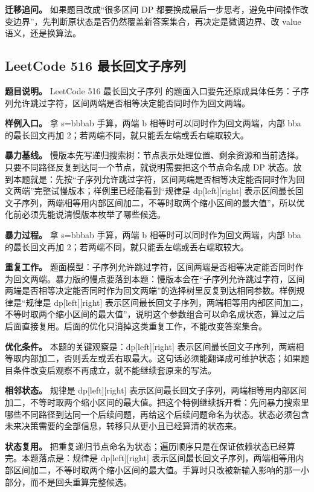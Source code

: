 \textbf{迁移追问。} 如果题目改成“很多区间 DP 都要换成最后一步思考，避免中间操作改变边界”，先判断原状态是否仍然覆盖新答案集合，再决定是微调边界、改 value 语义，还是换算法。

\subsection{LeetCode 516 最长回文子序列}

\textbf{题目说明。} LeetCode 516 最长回文子序列 的题面入口要先还原成具体任务：子序列允许跳过字符，区间两端是否相等决定能否同时作为回文两端。

\textbf{样例入口。} 拿 s=bbbab 手算，两端 b 相等时可以同时作为回文两端，内部 bba 的最长回文再加 2；若两端不同，就只能丢左端或丢右端取较大。

\textbf{暴力基线。} 慢版本先写递归搜索树：节点表示处理位置、剩余资源和当前选择。只要不同路径反复到达同一个节点，就说明需要把这个节点命名成 DP 状态。放到本题就是：先按“子序列允许跳过字符，区间两端是否相等决定能否同时作为回文两端”完整试慢版本；样例里已经能看到“规律是 dp[left][right] 表示区间最长回文子序列，两端相等用内部区间加二，不等时取两个缩小区间的最大值”，所以优化前必须先能说清慢版本枚举了哪些候选。

\textbf{暴力过程。} 拿 s=bbbab 手算，两端 b 相等时可以同时作为回文两端，内部 bba 的最长回文再加 2；若两端不同，就只能丢左端或丢右端取较大。

\textbf{重复工作。} 题面模型：子序列允许跳过字符，区间两端是否相等决定能否同时作为回文两端。暴力版的慢点要落到本题：慢版本会在“子序列允许跳过字符，区间两端是否相等决定能否同时作为回文两端”的选择树里反复到达相同参数。样例规律是“规律是 dp[left][right] 表示区间最长回文子序列，两端相等用内部区间加二，不等时取两个缩小区间的最大值”，说明这个参数组合可以命名成状态，算过之后后面直接复用。后面的优化只消掉这类重复工作，不能改变答案集合。

\textbf{优化条件。} 本题的关键观察是：dp[left][right] 表示区间最长回文子序列，两端相等取内部加二，否则丢左或丢右取最大。这句话必须能翻译成可维护状态；如果题目条件改变后观察不再成立，就不能继续套原来的写法。

\textbf{相邻状态。} 规律是 dp[left][right] 表示区间最长回文子序列，两端相等用内部区间加二，不等时取两个缩小区间的最大值。把这个特例继续拆开看：先问暴力搜索里哪些不同路径到达同一个后续问题，再给这个后续问题命名为状态。状态必须包含未来决策需要的全部信息，转移只从更小且已经算清的状态来。

\textbf{状态复用。} 把重复递归节点命名为状态；遍历顺序只是在保证依赖状态已经算完。本题落点是：规律是 dp[left][right] 表示区间最长回文子序列，两端相等用内部区间加二，不等时取两个缩小区间的最大值。手算时只改被新输入影响的那一小部分，而不是回头重算完整候选。


